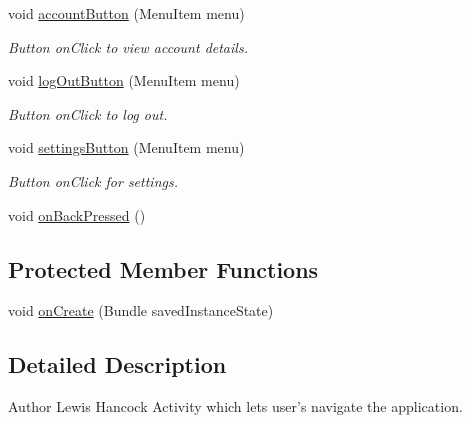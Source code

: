 \begin{DoxyCompactItemize}
void \hyperlink{classuk_1_1ac_1_1swan_1_1digitaltrails_1_1activities_1_1_home_activity_a779e60bfa94737d36c9afb4c5a77fee5}{account\+Button} (Menu\+Item menu)
\begin{DoxyCompactList}\small\item\em Button on\+Click to view account details. \end{DoxyCompactList}\item 
void \hyperlink{classuk_1_1ac_1_1swan_1_1digitaltrails_1_1activities_1_1_home_activity_a64d90984853f2cd6acef5d229a7e628a}{log\+Out\+Button} (Menu\+Item menu)
\begin{DoxyCompactList}\small\item\em Button on\+Click to log out. \end{DoxyCompactList}\item 
void \hyperlink{classuk_1_1ac_1_1swan_1_1digitaltrails_1_1activities_1_1_home_activity_a384bd7013fc6efa7e2b5ee6e64a230d0}{settings\+Button} (Menu\+Item menu)
\begin{DoxyCompactList}\small\item\em Button on\+Click for settings. \end{DoxyCompactList}\item 
void \hyperlink{classuk_1_1ac_1_1swan_1_1digitaltrails_1_1activities_1_1_home_activity_a362149a27621580122d7e8f480907558}{on\+Back\+Pressed} ()
\end{DoxyCompactItemize}
\subsection*{Protected Member Functions}
\begin{DoxyCompactItemize}
\item 
void \hyperlink{classuk_1_1ac_1_1swan_1_1digitaltrails_1_1activities_1_1_home_activity_aa39a35ebcd4ce26e55a91a78b54cf52b}{on\+Create} (Bundle saved\+Instance\+State)
\end{DoxyCompactItemize}


\subsection{Detailed Description}
\begin{DoxyAuthor}{Author}
Lewis Hancock Activity which lets user's navigate the application. 
\end{DoxyAuthor}


